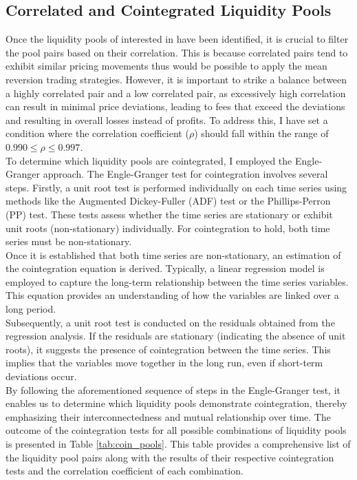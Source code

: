 \subsection{Correlated and Cointegrated Liquidity Pools}
Once the liquidity pools of interested in have been identified, it is crucial to filter the pool pairs based on their correlation. This is because correlated pairs tend to exhibit similar pricing movements thus would be possible to apply the mean reversion trading strategies. However, it is important to strike a balance between a highly correlated pair and a low correlated pair, as excessively high correlation can result in minimal price deviations, leading to fees that exceed the deviations and resulting in overall losses instead of profits. To address this, I have set a condition where the correlation coefficient ($\rho$) should fall within the range of $0.990 \leq \rho \leq 0.997$.
\\[5mm]
To determine which liquidity pools are cointegrated, I employed the Engle-Granger approach. The Engle-Granger test for cointegration involves several steps. Firstly, a unit root test is performed individually on each time series using methods like the Augmented Dickey-Fuller (ADF) test or the Phillips-Perron (PP) test. These tests assess whether the time series are stationary or exhibit unit roots (non-stationary) individually. For cointegration to hold, both time series must be non-stationary.
\\[5mm]
Once it is established that both time series are non-stationary, an estimation of the cointegration equation is derived. Typically, a linear regression model is employed to capture the long-term relationship between the time series variables. This equation provides an understanding of how the variables are linked over a long period.
\\[5mm]
Subsequently, a unit root test is conducted on the residuals obtained from the regression analysis. If the residuals are stationary (indicating the absence of unit roots), it suggests the presence of cointegration between the time series. This implies that the variables move together in the long run, even if short-term deviations occur.
\\[5mm]
By following the aforementioned sequence of steps in the Engle-Granger test, it enables us to determine which liquidity pools demonstrate cointegration, thereby emphasizing their interconnectedness and mutual relationship over time. The outcome of the cointegration tests for all possible combinations of liquidity pools is presented in Table \ref{tab:coin_pools}. This table provides a comprehensive list of the liquidity pool pairs along with the results of their respective cointegration tests and the correlation coefficient of each combination.
